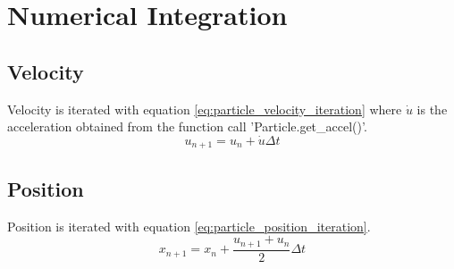 \documentclass[10pt,a4paper,titlepage]{report}
\begin{document}
\section{Numerical Integration} \label{sec:Numerical Integration}
\subsection{Velocity}
Velocity is iterated with equation \ref{eq:particle_velocity_iteration} where $\dot{u}$ is the acceleration obtained from the function call 'Particle.get{\_}accel()'.
\begin{equation}
u_{n+1} = u_{n} + \dot{u} \Delta t
\label{eq:particle_velocity_iteration}
\end{equation}
\subsection{Position}
Position is iterated with equation \ref{eq:particle_position_iteration}.
\begin{equation}
x_{n+1} = x_{n} + \dfrac{u_{n+1} + u_{n}}{2}\Delta t 
\label{eq:particle_position_iteration}
\end{equation}
\end{document}

